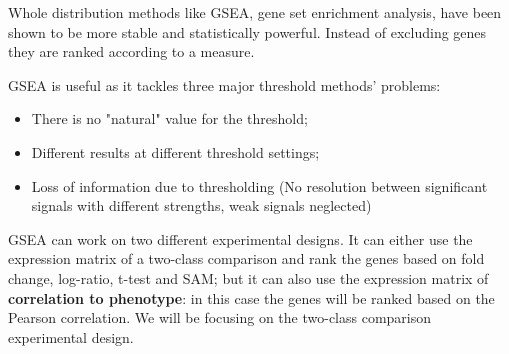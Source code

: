 	Whole distribution methods like GSEA, gene set enrichment analysis, have been shown to be more stable and statistically powerful.
	Instead of excluding genes they are ranked according to a measure.
	
	GSEA is useful as it tackles three major threshold methods' problems:
	\begin{itemize}
	\item There is no "natural" value for the threshold;
	\item Different results at different threshold settings;
	\item Loss of information due to thresholding (No resolution between significant signals with different strengths, weak signals neglected)
	\end{itemize}
	
	GSEA can work on two different experimental designs.
	It can either use the expression matrix of a two-class comparison and rank the genes based on fold change, log-ratio, t-test and SAM; but it can also use the expression matrix of \textbf{correlation to phenotype}: in this case the genes will be ranked based on the Pearson correlation.
	We will be focusing on the two-class comparison experimental design.

